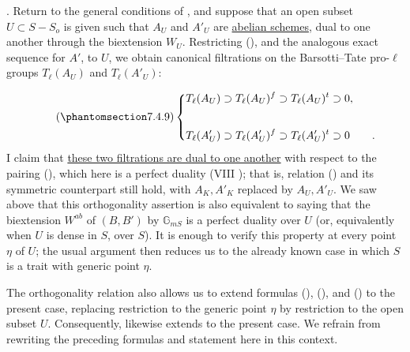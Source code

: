 \medskip
\noindent
{}. Return to the general conditions of , and suppose that an
open subset $U\subset S-S_o$ is given such that $A_U$ and $A'_U$ are
\underline{abelian schemes}, dual to one another through the
biextension $W_U$. Restricting (), and the analogous exact
sequence for $A'$, to $U$, we obtain canonical filtrations on the
Barsotti--Tate pro-$\ell$ groups $T_\ell(A_U)$ and $T_\ell(A'_U)$:

\begin{equation}\tag{\SGARefTarget{sga7.sga7i.eix.n7-4-9}{7.4.9}}
\left\{
\begin{aligned}
T_\ell(A_U)&\supset T_\ell(A_U)^f\supset T_\ell(A_U)^t\supset0,\\[4ex]
T_\ell(A'_U)&\supset T_\ell(A'_U)^f\supset T_\ell(A'_U)^t\supset0
\qquad .
\end{aligned}
\right.
\end{equation}
I claim that \underline{these two filtrations are dual to one another}
with respect to the pairing (), which here is a perfect duality
(VIII ); that is, relation () and its symmetric counterpart
still hold, with $A_K,A'_K$ replaced by $A_U,A'_U$. We saw above that
this orthogonality assertion is also equivalent to saying that the
biextension $W^{ab}$ of $(B,B')$ by $\mathbb G_{mS}$ is a perfect
duality over $U$ (or, equivalently when $U$ is dense in $S$, over
$S$). It is enough to verify this property at every point $\eta$ of
$U$; the usual argument then reduces us to the already known case in
which $S$ is a trait with generic point $\eta$.

The orthogonality relation also allows us to extend formulas (),
(), and () to the present case, replacing restriction to the
generic point $\eta$ by restriction to the open subset $U$.
Consequently,  likewise extends to the present case. We refrain
from rewriting the preceding formulas and statement here in this
context.
